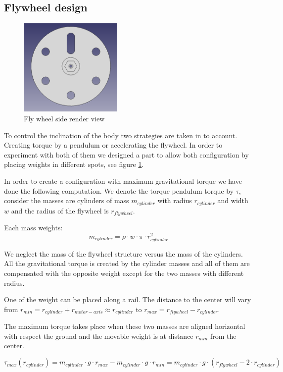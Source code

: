 \subsection{Flywheel design}
\begin{figure}
	\centering
	\includegraphics[width=5cm]{img/fly_wheel_side.png}
	\caption{Fly wheel side render view}
	\label{fig:Fly wheel side render view}
\end{figure}

To control the inclination of the body two strategies are taken in to account.
Creating torque by a pendulum or accelerating the flywheel.
In order to experiment with both of them we designed a part to allow
 both configuration by placing weights in different spots, see figure
 \ref{fig:Fly wheel side render view}.

In order to create a configuration with maximum gravitational torque
we have done the following computation. We denote the torque pendulum
torque by $\tau$, consider the masses are cylinders of mass $m_{cylinder}$
with radius $r_{cylinder}$ and width $w$ and the radius of the flywheel is $r_{flywheel}$.

Each mass weights:
\[ m_{cylinder} = \rho \cdot w \cdot \pi \cdot r_{cylinder}^2 \]

We neglect the mass of the flywheel structure versus the mass of the cylinders. All
the gravitational torque is created by the cylinder masses and all of them are compensated
with the opposite weight except for the two masses with different radius.

One of the weight can be placed along a rail. The distance to the center will
vary from $r_{min} = r_{cylinder} + r_{motor-axis} \approx r_{cylinder} $ to $r_{max} = r_{flywheel} - r_{cylinder}$. 

The maximum torque takes place when these two masses are aligned horizontal with respect the ground and the movable weight is at distance $r_{min}$ from the center.

\[ \tau _{max} (r_{cylinder}) =  m_{cylinder} \cdot g \cdot r_{max} -  m_{cylinder} \cdot g \cdot r_{min} =
 m_{cylinder}\cdot g \cdot (r_{flywheel} - 2 \cdot r_{cylinder}) \]

